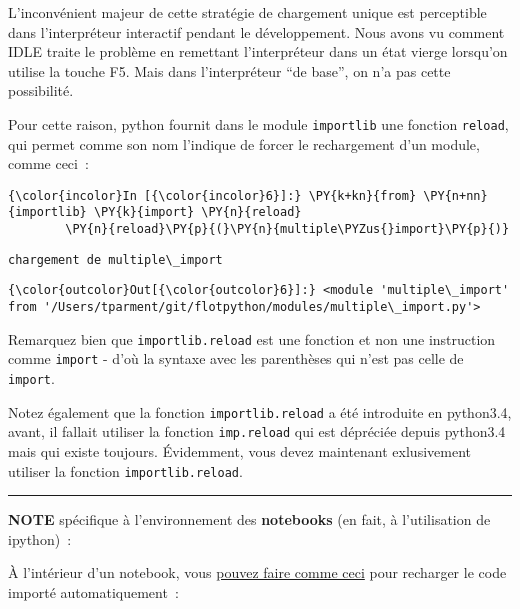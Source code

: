    L'inconvénient majeur de cette stratégie de chargement unique est
perceptible dans l'interpréteur interactif pendant le développement.
Nous avons vu comment IDLE traite le problème en remettant
l'interpréteur dans un état vierge lorsqu'on utilise la touche F5. Mais
dans l'interpréteur ``de base'', on n'a pas cette possibilité.

    Pour cette raison, python fournit dans le module \texttt{importlib} une
fonction \texttt{reload}, qui permet comme son nom l'indique de forcer
le rechargement d'un module, comme ceci~:

    \begin{Verbatim}[commandchars=\\\{\}]
{\color{incolor}In [{\color{incolor}6}]:} \PY{k+kn}{from} \PY{n+nn}{importlib} \PY{k}{import} \PY{n}{reload}
        \PY{n}{reload}\PY{p}{(}\PY{n}{multiple\PYZus{}import}\PY{p}{)}
\end{Verbatim}


    \begin{Verbatim}[commandchars=\\\{\}]
chargement de multiple\_import

    \end{Verbatim}

\begin{Verbatim}[commandchars=\\\{\}]
{\color{outcolor}Out[{\color{outcolor}6}]:} <module 'multiple\_import' from '/Users/tparment/git/flotpython/modules/multiple\_import.py'>
\end{Verbatim}
            
    Remarquez bien que \texttt{importlib.reload} est une fonction et non une
instruction comme \texttt{import} - d'où la syntaxe avec les parenthèses
qui n'est pas celle de \texttt{import}.

Notez également que la fonction \texttt{importlib.reload} a été
introduite en python3.4, avant, il fallait utiliser la fonction
\texttt{imp.reload} qui est dépréciée depuis python3.4 mais qui existe
toujours. Évidemment, vous devez maintenant exlusivement utiliser la
fonction \texttt{importlib.reload}.

    \begin{center}\rule{0.5\linewidth}{\linethickness}\end{center}

    \textbf{NOTE} spécifique à l'environnement des \textbf{notebooks} (en
fait, à l'utilisation de ipython)~:

À l'intérieur d'un notebook, vous
\href{https://ipython.org/ipython-doc/3/config/extensions/autoreload.html}{pouvez
faire comme ceci} pour recharger le code importé automatiquement~:

